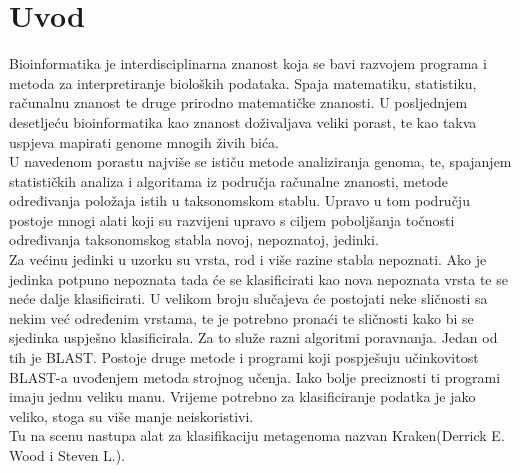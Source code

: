 \documentclass[times, utf8, zavrsni]{fer}
\begin{document}
\chapter{Uvod}
Bioinformatika je interdisciplinarna znanost koja se bavi razvojem programa i metoda za interpretiranje bioloških podataka. Spaja matematiku, statistiku, računalnu znanost te druge prirodno matematičke znanosti. U posljednjem desetljeću bioinformatika kao znanost doživaljava veliki porast, te kao takva uspjeva mapirati genome mnogih živih bića.\\
U navedenom porastu najviše se ističu metode analiziranja genoma, te, spajanjem statističkih analiza i algoritama iz područja računalne znanosti, metode određivanja položaja istih u taksonomskom stablu. Upravo u tom području postoje mnogi alati koji su razvijeni upravo s ciljem poboljšanja točnosti određivanja taksonomskog stabla novoj, nepoznatoj, jedinki.\\ Za većinu jedinki u uzorku su vrsta, rod i više razine stabla nepoznati. Ako je jedinka potpuno nepoznata tada će se klasificirati kao nova nepoznata vrsta te se neće dalje klasificirati. U velikom broju slučajeva će postojati neke sličnosti sa nekim već određenim vrstama, te je potrebno pronaći te sličnosti kako bi se sjedinka uspješno klasificirala. Za to služe razni algoritmi poravnanja. Jedan od tih je BLAST. Postoje druge metode i programi koji pospješuju učinkovitost BLAST-a uvođenjem metoda strojnog učenja. Iako bolje preciznosti ti programi imaju jednu veliku manu. Vrijeme potrebno za klasificiranje podatka je jako veliko, stoga su više manje neiskoristivi. \\Tu na scenu nastupa alat za klasifikaciju metagenoma nazvan Kraken(Derrick E. Wood i Steven L.).
\end{document}

